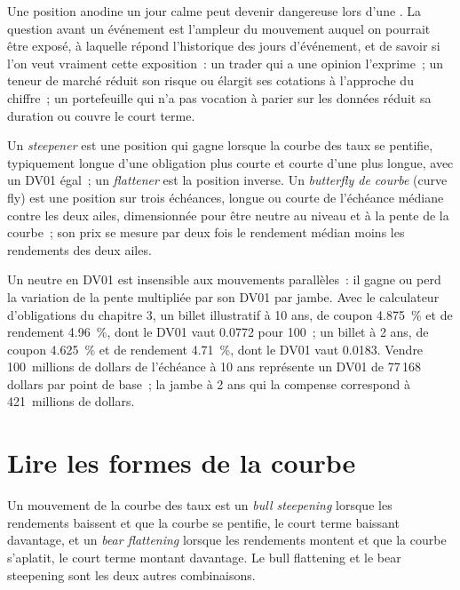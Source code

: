 Une position anodine un jour calme peut devenir dangereuse lors d'une . La question
avant un événement est l'ampleur du mouvement auquel on pourrait être exposé, à laquelle répond l'historique des jours d'événement,
et de savoir si l'on veut vraiment cette exposition~: un trader qui a une opinion l'exprime~; un
teneur de marché réduit son risque ou élargit ses cotations à l'approche du chiffre~; un portefeuille qui n'a pas vocation à
parier sur les données réduit sa duration ou couvre le court terme.

\begin{definition}\label{def:m2:reading-a-macro-calendar-and-a-rates-screen:steep}
Un \emph{steepener} est une position qui gagne lorsque la courbe des taux
se pentifie, typiquement longue d'une obligation plus courte et courte d'une plus longue, avec un DV01 égal~; un
\emph{flattener} est la position inverse. Un \emph{butterfly de courbe} (curve fly) est
une position sur trois échéances, longue ou courte de l'échéance médiane contre les deux ailes, dimensionnée pour être
neutre au niveau et à la pente de la courbe~; son prix se mesure par deux fois le rendement médian
moins les rendements des deux ailes.
\end{definition}

Un  neutre en DV01 est insensible aux mouvements parallèles~: il gagne ou perd la variation
de la pente multipliée par son DV01 par jambe. Avec le calculateur d'obligations du chapitre 3, un billet illustratif
à 10 ans, de coupon 4.875~\% et de rendement 4.96~\%, dont le DV01 vaut 0.0772 pour 100~; un billet
à 2 ans, de coupon 4.625~\% et de rendement 4.71~\%, dont le DV01 vaut 0.0183. Vendre 100~millions de dollars de l'échéance à 10 ans représente un
DV01 de 77\,168 dollars par point de base~; la jambe à 2 ans qui la compense correspond à 421~millions de dollars.

\section{Lire les formes de la courbe}

\begin{definition}\label{def:m2:reading-a-macro-calendar-and-a-rates-screen:bull}
Un mouvement de la courbe des taux est un \emph{bull steepening} lorsque les rendements baissent
et que la courbe se pentifie, le court terme baissant davantage, et un \emph{bear flattening}
lorsque les rendements montent et que la courbe s'aplatit, le court terme montant davantage. Le bull flattening et
le bear steepening sont les deux autres combinaisons.
\end{definition}

